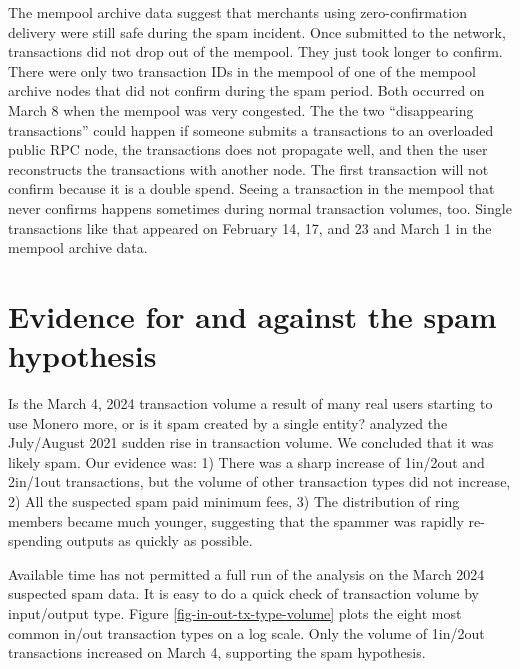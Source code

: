 \documentclass[usletter,11pt,english,openany]{article}
\begin{document}
The mempool archive data suggest that merchants using zero-confirmation
delivery were still safe during the spam incident. Once submitted
to the network, transactions did not drop out of the mempool. They
just took longer to confirm. There were only two transaction IDs in
the mempool of one of the mempool archive nodes that did not confirm
during the spam period. Both occurred on March 8 when the mempool
was very congested. The the two ``disappearing transactions'' could
happen if someone submits a transactions to an overloaded public RPC
node, the transactions does not propagate well, and then the user
reconstructs the transactions with another node. The first transaction
will not confirm because it is a double spend. Seeing a transaction
in the mempool that never confirms happens sometimes during normal
transaction volumes, too. Single transactions like that appeared on
February 14, 17, and 23 and March 1 in the mempool archive data.

\section{Evidence for and against the spam hypothesis}

Is the March 4, 2024 transaction volume a result of many real users
starting to use Monero more, or is it spam created by a single entity?
\cite{Krawiec-Thayer2021} analyzed the July/August 2021 sudden rise
in transaction volume. We concluded that it was likely spam. Our evidence
was: 1) There was a sharp increase of 1in/2out and 2in/1out transactions,
but the volume of other transaction types did not increase, 2) All
the suspected spam paid minimum fees, 3) The distribution of ring
members became much younger, suggesting that the spammer was rapidly
re-spending outputs as quickly as possible.

Available time has not permitted a full run of the \cite{Krawiec-Thayer2021}
analysis on the March 2024 suspected spam data. It is easy to do a
quick check of transaction volume by input/output type. Figure \ref{fig-in-out-tx-type-volume}
plots the eight most common in/out transaction types on a log scale.
Only the volume of 1in/2out transactions increased on March 4, supporting
the spam hypothesis.
\end{document}
